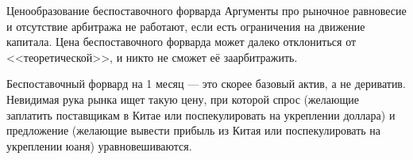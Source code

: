 \documentclass{beamer}
\begin{document}
\begin{frame}{Ценообразование беспоставочного форварда}
\justify
Аргументы про рыночное равновесие и отсутствие арбитража не работают, если есть ограничения на движение капитала. Цена беспоставочного форварда может далеко отклониться от <<теоретической>>, и никто не сможет её заарбитражить.

\justify
Беспоставочный форвард на 1 месяц --- это скорее базовый актив, а не дериватив. Невидимая рука рынка ищет такую цену, при которой спрос (желающие заплатить поставщикам в Китае или поспекулировать на укреплении доллара) и предложение (желающие вывести прибыль из Китая или поспекулировать на укреплении юаня) уравновешиваются.
\end{frame}
\end{document}
